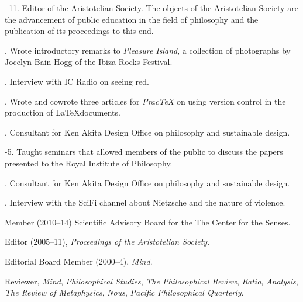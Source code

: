 \documentclass[11pt]{article}
\begin{document}
--11. Editor of the Aristotelian Society. The objects of the Aristotelian Society are the advancement of public education in the field of philosophy and the publication of its proceedings to this end. 

. Wrote introductory remarks to \emph{Pleasure Island}, a collection of photographs by Jocelyn Bain Hogg of the Ibiza Rocks Festival.

. Interview with IC Radio on seeing red.

. Wrote and cowrote three articles for \emph{PracTeX} on using version control in the production of \LaTeX documents.

. Consultant for Ken Akita Design Office on philosophy and sustainable design.

-5. Taught seminars that allowed members of the public to discuss the papers presented to the Royal Institute of Philosophy.

. Consultant for Ken Akita Design Office on philosophy and sustainable design.

. Interview with the SciFi channel about Nietzsche and the nature of violence.

\bigskip

\medskip


\ind Member (2010--14) Scientific Advisory Board for the The Center for the Senses.

\ind Editor (2005--11), \emph{Proceedings of the Aristotelian Society}.

\ind Editorial Board Member (2000--4), \emph{Mind}. 

\ind Reviewer, \emph{Mind}, \emph{Philosophical Studies},
\emph{The Philosophical Review}, \emph{Ratio}, \emph{Analysis}, \emph{The Review of Metaphysics}, \emph{Nous}, \emph{Pacific Philosophical Quarterly}.
\end{document}
